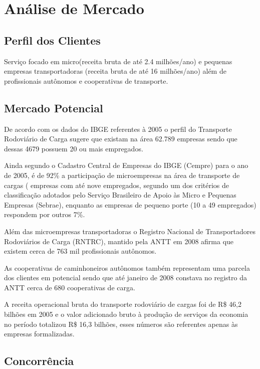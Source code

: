 \chapter{Análise de Mercado}\label{mercado}

\section{Perfil dos Clientes}

  Serviço focado em micro(receita bruta de até 2.4 milhões/ano) e pequenas empresas transportadoras (receita bruta de até 16 milhões/ano) além de profissionais autônomos e cooperativas de transporte.

\section{Mercado Potencial}

  De acordo com os dados do IBGE referentes à 2005 o perfil do Transporte Rodoviário de Carga sugere que existam na área 62.789 empresas sendo que dessas 4679 possuem 20 ou mais empregados.

  Ainda segundo o Cadastro Central de Empresas do IBGE (Cempre) para o ano de 2005, é de 92\% a participação de microempresas na área de transporte de cargas ( empresas com até nove empregados, segundo um dos critérios de classificação adotados pelo Serviço Brasileiro de Apoio às Micro e Pequenas Empresas (Sebrae), enquanto as empresas de pequeno porte (10 a 49 empregados) respondem por outros 7\%.

  Além das microempresas transportadoras o  Registro Nacional de Transportadores Rodoviários de Carga (RNTRC), mantido pela ANTT em 2008 afirma que existem cerca de 763 mil profissionais autônomos.
  
  As cooperativas de caminhoneiros autônomos também representam uma parcela dos clientes em potencial sendo que até janeiro de 2008 constava no registro da ANTT cerca de 680 cooperativas de carga.

  A receita operacional bruta do transporte rodoviário de cargas foi de R\$ 46,2 bilhões em 2005 e o valor adicionado bruto à produção de serviços da economia no período totalizou R\$ 16,3 bilhões, esses números são referentes apenas às empresas formalizadas.

\section{Concorrência}

